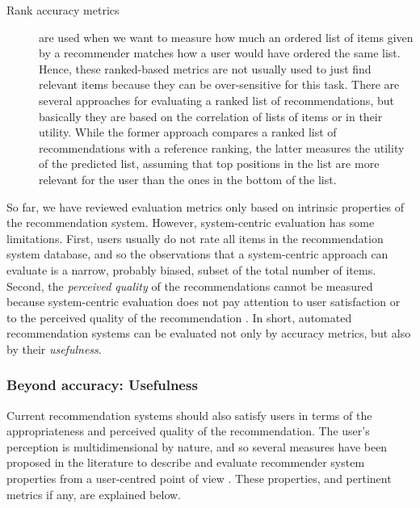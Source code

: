 \begin{description}
	\item [Rank accuracy metrics] are used when we want to measure how much an ordered list of items given by a recommender matches how a user would have ordered the same list. Hence, these ranked-based metrics are not usually used to just find relevant items because they can be over-sensitive for this task. 
There are several approaches for evaluating a ranked list of recommendations, but basically they are based on the correlation of lists of items or in their utility. 
While the former approach compares a ranked list of recommendations with a reference ranking, the latter measures the utility of the predicted list, assuming that top positions in the list are more relevant for the user than the ones in the bottom of the list.
\end{description}

So far, we have reviewed evaluation metrics only based on intrinsic properties of the recommendation system. However, system-centric evaluation has some limitations. 
First, users usually do not rate all items in the recommendation system database, and so the observations that a system-centric approach can evaluate is a narrow, probably biased, subset of the total number of items. 
Second, the \emph{perceived quality} of the recommendations cannot be measured because system-centric evaluation does not pay attention to user satisfaction or to the perceived quality of the recommendation \autocite{adomavicius05toward}. 
In short, automated recommendation systems can be evaluated not only by accuracy metrics, but also by their \emph{usefulness}.






\subsubsection{Beyond accuracy: Usefulness} \label{section:usefulness}
Current recommendation systems should also satisfy users in terms of the appropriateness and perceived quality of the recommendation. The user's perception is multidimensional by nature, and so several measures have been proposed in the literature to describe and evaluate recommender system properties from a user-centred point of view \autocite{herlocker04evaluating, celma08new, shani11evaluating, knijnenburg12explaining}. 
These properties, and pertinent metrics if any, are explained below.


